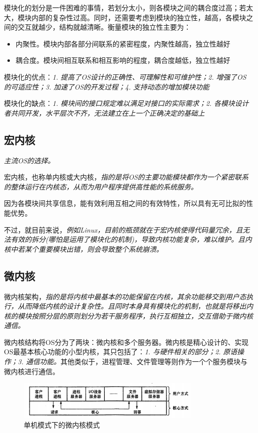     模块化的划分是一件困难的事情，若划分太小，则各模块之间的耦合度过高；若太大，模块内部的复杂性过高。同时，还需要考虑到模块的独立性，越高，各模块之间的交互就越少，结构就越清晰。衡量模块的独立性主要为：

\begin{itemize}
    \item 内聚性。模块内部各部分间联系的紧密程度，内聚性越高，独立性越好
    \item 耦合度。模块间相互联系和相互影响的程度，耦合度越低，独立性越好
\end{itemize}

    模块化的优点：\emph{1. 提高了OS设计的正确性、可理解性和可维护性；2. 增强了OS的可适应性；3. 加速了OS的开发过程；4. 支持动态的增加模块功能}

    模块化的缺点：\emph{1. 模块间的接口规定难以满足对接口的实际需求；2. 各模块设计者共同开发，水平层次不齐，无法建立在上一个正确决定的基础上}

\subsection{宏内核}

    \emph{主流OS的选择。}

    宏内核，也称单内核或大内核，\emph{指的是将OS的主要功能模块都作为一个紧密联系的整体运行在内核态，从而为用户程序提供高性能的系统服务。}

    因为各模块间共享信息，能有效利用互相之间的有效特性，所以具有无可比拟的性能优势。

    不过，就目前来说，\emph{例如Linux，目前的瓶颈就在于宏内核使得代码量冗余，且无法有效的拆分(哪怕是运用了模块化的机制)，导致内核功能复杂，难以维护。且内核中若某个重要模块出错，则会导致整个系统崩溃。}

\subsection{微内核}

    微内核架构，\emph{指的是将内核中最基本的功能保留在内核，其余功能移交到用户态执行，从而降低内核的设计复杂性。且同时本身具有模块化的机制，也就是将移出内核的模块按照分层的原则划分为若干服务程序，执行互相独立，交互借助于微内核通信。}

    微内核结构将OS分为了两块：微内核和多个服务器。微内核是精心设计的、实现OS最基本核心功能的小型内核，其只包括了：\emph{1. 与硬件相关的部分；2. 原语操作；3. 通信功能。}其他类似于，进程管理、文件管理等则作为一个个服务模块与微内核进行通信。

\begin{figure}[!htbp]
    \centering
    \includegraphics[width=0.8\textwidth]{image/chapter01/单机下的微内核模式.png}
    \caption{单机模式下的微内核模式}
\end{figure}

